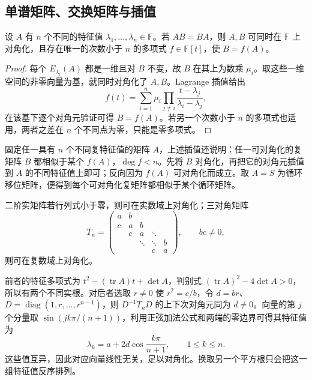 \subsection{单谱矩阵、交换矩阵与插值}

\begin{proposition}
\label{prop:xie-ex-eig-simple-spectrum-centralizer}
设 $A$ 有 $n$ 个不同的特征值 $\lambda_1,\ldots,\lambda_n\in\mathbb F$。若 $AB=BA$，则 $A,B$ 可同时在 $\mathbb F$ 上对角化，且存在唯一的次数小于 $n$ 的多项式 $f\in\mathbb F[t]$，使 $B=f(A)$。
\end{proposition}
\begin{proof}
每个 $E_{\lambda_i}(A)$ 都是一维且对 $B$ 不变，故 $B$ 在其上为数乘 $\mu_i$。取这些一维空间的非零向量为基，就同时对角化了 $A,B$。Lagrange 插值给出
\[
f(t)=\sum_{i=1}^n\mu_i\prod_{j\ne i}\frac{t-\lambda_j}{\lambda_i-\lambda_j},
\]
在该基下逐个对角元验证可得 $B=f(A)$。若另一个次数小于 $n$ 的多项式也适用，两者之差在 $n$ 个不同点为零，只能是零多项式。
\end{proof}

固定任一具有 $n$ 个不同复特征值的矩阵 $A$，上述插值还说明：任一可对角化的复矩阵 $B$ 都相似于某个 $f(A)$，$\deg f<n$。先将 $B$ 对角化，再把它的对角元插值到 $A$ 的不同特征值上即可；反向因为 $f(A)$ 可对角化而成立。取 $A=S$ 为循环移位矩阵，便得到每个可对角化复矩阵都相似于某个循环矩阵。

\begin{example}
二阶实矩阵若行列式小于零，则可在实数域上对角化；三对角矩阵
\[
T_n=\begin{pmatrix}
a&b&&&\\c&a&b&&\\&c&a&\ddots&\\&&\ddots&\ddots&b\\&&&c&a
\end{pmatrix},\qquad bc\ne0,
\]
则可在复数域上对角化。
\end{example}
\begin{solve}
前者的特征多项式为 $t^2-(\operatorname{tr}A)t+\det A$，判别式 $(\operatorname{tr}A)^2-4\det A>0$，所以有两个不同实根。对后者选取 $r\ne0$ 使 $r^2=c/b$，令 $d=br$、$D=\operatorname{diag}(1,r,\ldots,r^{n-1})$，则 $D^{-1}T_nD$ 的上下次对角元同为 $d\ne0$。向量的第 $j$ 个分量取 $\sin(jk\pi/(n+1))$，利用正弦加法公式和两端的零边界可得其特征值为
\[
\lambda_k=a+2d\cos\frac{k\pi}{n+1},\qquad 1\le k\le n.
\]
这些值互异，因此对应向量线性无关，足以对角化。换取另一个平方根只会把这一组特征值反序排列。
\end{solve}

